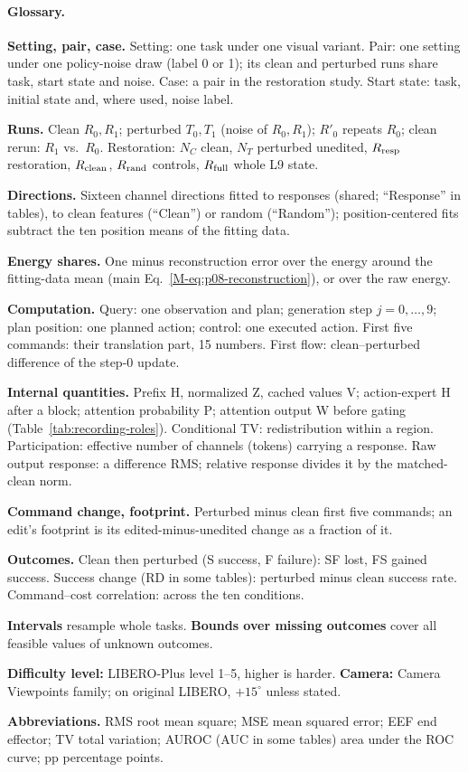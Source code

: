 \paragraph{Glossary.}
\begin{guidelist}
\item \textbf{Setting, pair, case.} Setting: one task under one visual variant. Pair: one setting under one policy-noise draw (label 0 or 1); its clean and perturbed runs share task, start state and noise. Case: a pair in the restoration study. Start state: task, initial state and, where used, noise label.
\item \textbf{Runs.} Clean $R_0,R_1$; perturbed $T_0,T_1$ (noise of $R_0,R_1$); $R'_0$ repeats $R_0$; clean rerun: $R_1$ vs.\ $R_0$. Restoration: $N_C$ clean, $N_T$ perturbed unedited, $R_{\rm resp}$ restoration, $R_{\rm clean}$, $R_{\rm rand}$ controls, $R_{\rm full}$ whole L9 state.
\item \textbf{Directions.} Sixteen channel directions fitted to responses (shared; ``Response'' in tables), to clean features (``Clean'') or random (``Random''); position-centered fits subtract the ten position means of the fitting data.
\item \textbf{Energy shares.} One minus reconstruction error over the energy around the fitting-data mean (main Eq.~\ref{M-eq:p08-reconstruction}), or over the raw energy.
\item \textbf{Computation.} Query: one observation and plan; generation step $j=0,\ldots,9$; plan position: one planned action; control: one executed action. First five commands: their translation part, 15 numbers. First flow: clean--perturbed difference of the step-0 update.
\item \textbf{Internal quantities.} Prefix H, normalized Z, cached values V; action-expert H after a block; attention probability P; attention output W before gating (Table~\ref{tab:recording-roles}). Conditional TV: redistribution within a region. Participation: effective number of channels (tokens) carrying a response. Raw output response: a difference RMS; relative response divides it by the matched-clean norm.
\item \textbf{Command change, footprint.} Perturbed minus clean first five commands; an edit's footprint is its edited-minus-unedited change as a fraction of it.
\item \textbf{Outcomes.} Clean then perturbed (S success, F failure): SF lost, FS gained success. Success change (RD in some tables): perturbed minus clean success rate. Command--cost correlation: across the ten conditions.
\item \textbf{Intervals} resample whole tasks. \textbf{Bounds over missing outcomes} cover all feasible values of unknown outcomes.
\item \textbf{Difficulty level:} LIBERO-Plus level 1--5, higher is harder. \textbf{Camera:} Camera Viewpoints family; on original LIBERO, $+15^\circ$ unless stated.
\item \textbf{Abbreviations.} RMS root mean square; MSE mean squared error; EEF end effector; TV total variation; AUROC (AUC in some tables) area under the ROC curve; pp percentage points.
\end{guidelist}

